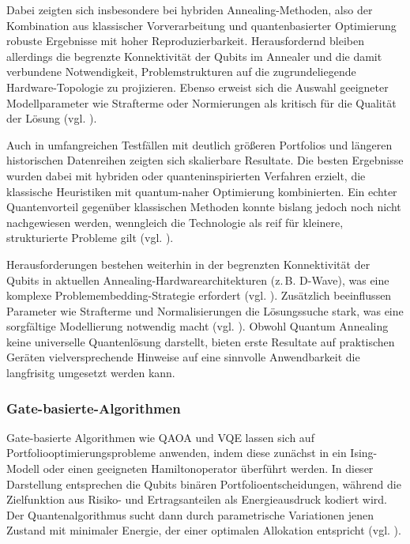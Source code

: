 Dabei zeigten sich insbesondere bei hybriden Annealing-Methoden, also der Kombination aus klassischer Vorverarbeitung und quantenbasierter Optimierung robuste Ergebnisse mit hoher Reproduzierbarkeit. Herausfordernd bleiben allerdings die begrenzte Konnektivität der Qubits im Annealer und die damit verbundene Notwendigkeit, Problemstrukturen auf die zugrundeliegende Hardware-Topologie zu projizieren. Ebenso erweist sich die Auswahl geeigneter Modellparameter wie Strafterme oder Normierungen als kritisch für die Qualität der Lösung (vgl. \cite{sakuler_real-world_2025}).
 
Auch in umfangreichen Testfällen mit deutlich größeren Portfolios und längeren historischen Datenreihen zeigten sich skalierbare Resultate. Die besten Ergebnisse wurden dabei mit hybriden oder quanteninspirierten Verfahren erzielt, die klassische Heuristiken mit quantum-naher Optimierung kombinierten. Ein echter Quantenvorteil gegenüber klassischen Methoden konnte bislang jedoch noch nicht nachgewiesen werden, wenngleich die Technologie als reif für kleinere, strukturierte Probleme gilt (vgl. \cite{BBVA, 2023}).

Herausforderungen bestehen weiterhin in der begrenzten Konnektivität der Qubits in aktuellen Annealing-Hardwarearchitekturen (z.\,B. D-Wave), was eine komplexe Problemembedding-Strategie erfordert (vgl. \cite{orus_quantum_2019}). Zusätzlich beeinflussen Parameter wie Strafterme und Normalisierungen die Lösungssuche stark, was eine sorgfältige Modellierung notwendig macht (vgl. \cite{sakuler_real-world_2025}). Obwohl Quantum Annealing keine universelle Quantenlösung darstellt, bieten erste Resultate auf praktischen Geräten vielversprechende Hinweise auf eine sinnvolle Anwendbarkeit die langfrisitg umgesetzt werden kann.

\subsubsection*{Gate-basierte-Algorithmen}
 
Gate-basierte Algorithmen wie QAOA und VQE lassen sich auf Portfoliooptimierungsprobleme anwenden, indem diese zunächst in ein Ising-Modell oder einen geeigneten Hamiltonoperator überführt werden. In dieser Darstellung entsprechen die Qubits binären Portfolioentscheidungen, während die Zielfunktion aus Risiko- und Ertragsanteilen als Energieausdruck kodiert wird. Der Quantenalgorithmus sucht dann durch parametrische Variationen jenen Zustand mit minimaler Energie, der einer optimalen Allokation entspricht (vgl. \cite{buonaiuto_best_2023, brandhofer_benchmarking_2022}).

